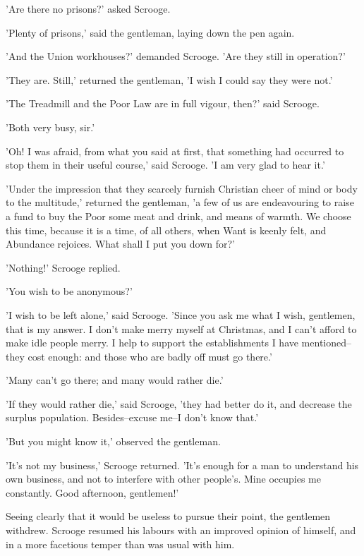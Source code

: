 'Are there no prisons?' asked Scrooge.

'Plenty of prisons,' said the gentleman, laying down the pen again.

'And the Union workhouses?' demanded Scrooge. 'Are they still in
operation?'

'They are. Still,' returned the gentleman, 'I wish I could say they were
not.'

'The Treadmill and the Poor Law are in full vigour, then?' said Scrooge.

'Both very busy, sir.'

'Oh! I was afraid, from what you said at first, that something had
occurred to stop them in their useful course,' said Scrooge. 'I am very
glad to hear it.'

'Under the impression that they scarcely furnish Christian cheer of mind
or body to the multitude,' returned the gentleman, 'a few of us are
endeavouring to raise a fund to buy the Poor some meat and drink, and
means of warmth. We choose this time, because it is a time, of all
others, when Want is keenly felt, and Abundance rejoices. What shall I
put you down for?'

'Nothing!' Scrooge replied.

'You wish to be anonymous?'

'I wish to be left alone,' said Scrooge. 'Since you ask me what I wish,
gentlemen, that is my answer. I don't make merry myself at Christmas,
and I can't afford to make idle people merry. I help to support the
establishments I have mentioned--they cost enough: and those who are
badly off must go there.'

'Many can't go there; and many would rather die.'

'If they would rather die,' said Scrooge, 'they had better do it, and
decrease the surplus population. Besides--excuse me--I don't know that.'

'But you might know it,' observed the gentleman.

'It's not my business,' Scrooge returned. 'It's enough for a man to
understand his own business, and not to interfere with other people's.
Mine occupies me constantly. Good afternoon, gentlemen!'

Seeing clearly that it would be useless to pursue their point, the
gentlemen withdrew. Scrooge resumed his labours with an improved opinion
of himself, and in a more facetious temper than was usual with him.

